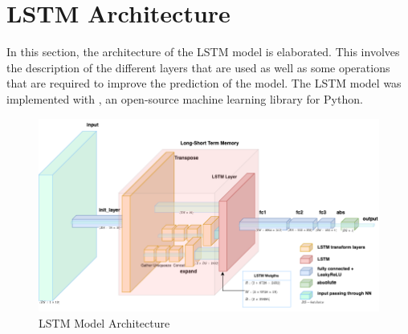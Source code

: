   
\section{LSTM Architecture}
\label{sec:lstm-architecture-and-implementation}

  In this section, the architecture of the LSTM model is elaborated.
  This involves the description of the different layers that are used as well as some operations that are required to improve the prediction of the model.
  The LSTM model was implemented with , an open-source machine learning library for Python. 
  \begin{figure}
    \centering
    \includegraphics[scale=0.5]{figures/current_lstm_model.png}
    \caption{LSTM Model Architecture}
    \label{fig:lstm-model-architecture}
  \end{figure}

